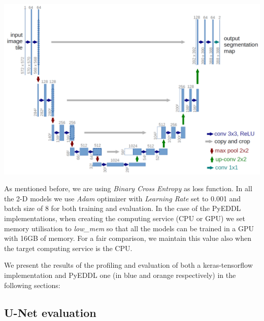 \begin{center}
\hspace*{15pt}
\includegraphics[width=\textwidth]{images/unet.png}
\end{center}

As mentioned before, we are using \textit{Binary Cross Entropy} as loss function. In all the 2-D models we use \textit{Adam} optimizer with \textit{Learning Rate} set to 0.001 and batch size of 8 for both training and evaluation. In the case of the PyEDDL implementations, when creating the computing service (CPU or GPU) we set memory utilisation to \textit{low\_mem} so that all the models can be trained in a GPU with 16GB of memory. For a fair comparison, we maintain this value also when the target computing service is the CPU. 

We present the results of the profiling and evaluation of both a keras-tensorflow implementation and PyEDDL one (in blue and orange respectively) in the following sections:


\subsection{U-Net evaluation}

